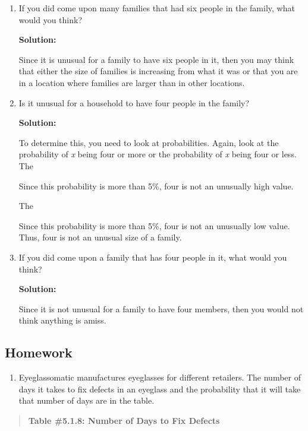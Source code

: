 \documentclass[]{book}
\providecommand{\tightlist}{%
  \setlength{\itemsep}{0pt}\setlength{\parskip}{0pt}}
\begin{document}
\begin{enumerate}
\def\labelenumi{\alph{enumi}.}
\setcounter{enumi}{1}
\item
  If you did come upon many families that had six people in the
  family, what would you think?

  \textbf{Solution:}

  Since it is unusual for a family to have six people in it, then you
  may think that either the size of families is increasing from what
  it was or that you are in a location where families are larger than
  in other locations.
\item
  Is it unusual for a household to have four people in the family?

  \textbf{Solution:}

  To determine this, you need to look at probabilities. Again, look at
  the probability of \emph{x} being four or more or the probability of \emph{x}
  being four or less. The

  Since this probability is more than 5\%, four is not an unusually
  high value.

  The

  Since this probability is more than 5\%, four is not an unusually low
  value. Thus, four is not an unusual size of a family.
\item
  If you did come upon a family that has four people in it, what would
  you think?

  \textbf{Solution:}

  Since it is not unusual for a family to have four members, then you
  would not think anything is amiss.
\end{enumerate}

\hypertarget{homework-13}{%
\subsection{Homework}\label{homework-13}}

\begin{enumerate}
\def\labelenumi{\arabic{enumi}.}
\tightlist
\item
  Eyeglassomatic manufactures eyeglasses for different retailers. The number of days it takes to fix defects in an eyeglass and the probability that it will take that number of days are in the table.
\end{enumerate}

\begin{quote}
\textbf{Table \#5.1.8: Number of Days to Fix Defects}
\end{quote}
\end{document}
